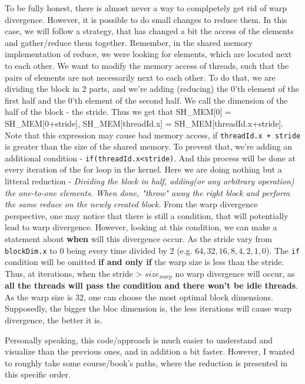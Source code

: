 To be fully honest, there is almost never a way to complpetely get rid of warp divergence.
However, it is possible to do small changes to reduce them. 
In this case, we will follow a strategy, that has changed a bit the access of the elements and 
gather/reduce them together. Remember, in the shared memory implementation of reduce, we were 
looking for elements, which are located next to each other. 
We want to modify the memory access of threads, such that the pairs of elements are not necessarily next to each other. To do that, we are dividing the block in 2 parts, and we're adding (reducing) the 
0'th element of the first half and the 0'th element of the second half. We call the dimension
of the half of the block - the stride. Thus we get that SH\_MEM[0] = SH\_MEM[0+stride], 
SH\_MEM[threadId.x] = SH\_MEM[threadId.x+stride]. Note that this expression may cause bad memory 
access, if \verb|threadId.x + stride| is greater than the size of the shared memory. To prevent that, 
we're adding an additional condition - \verb|if(threadId.x<stride)|.
And this process will be done at every iteration
of the for loop in the kernel. Here we are doing nothing but a litteral reduction - \textit{Dividing
the block in half, adding(or any arbitrary operation) the one-to-one elements. When done, 
"throw" away the right block and perform the same reduce on the newly created block.}
From the warp divergence perspective, one may notice that there is still a condition, that will potentially
lead to warp divergence. However, looking at this condition, we can make a statement 
about \textbf{when} will this divergence occur. As the stride vary from \verb|blockDim.x| to 
$0$ being every time divided by 2 (e.g. $64, 32, 16, 8, 4, 2, 1, 0$). The \verb|if| condition will be
omitted \textbf{if and only if} the warp size is less than the stride. Thus, at iterations, when
the stride > $size_{warp}$ no warp divergence will occur, as \textbf{all the threads will pass the condition and there won't be idle threads}. As the warp size is $32$, one can choose the most optimal block dimensions.
Supposedly, the bigger the bloc dimension is, the less iterations will cause warp divergence, the better it is. 

Personally speaking, this code/approach is much easier to understand and visualize than the previous ones, and in addition
a bit faster. However, I wanted to roughly take some course/book's paths, where the reduction is 
presented in this specific order.


